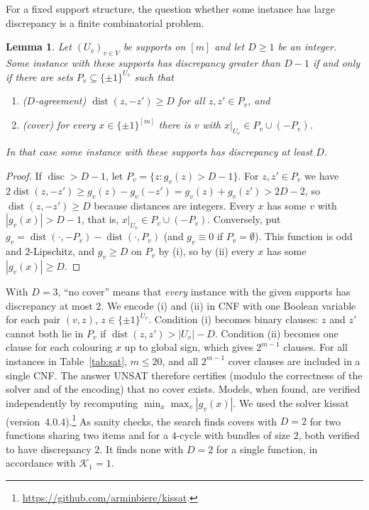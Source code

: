 \documentclass[11pt,letterpaper]{article}
\newtheorem{lemma}[theorem]{Lemma}
\theoremstyle{definition}
\newcommand{\cube}[1]{\{\pm1\}^{#1}}
\DeclareMathOperator{\disc}{disc}
\DeclareMathOperator{\dist}{dist}
\begin{document}
For a fixed support structure, the question whether some instance has large discrepancy is a
finite combinatorial problem.

\begin{lemma}\label{lem:cover}
Let $(U_v)_{v\in V}$ be supports on $[m]$ and let $D\ge1$ be an integer. Some instance with these
supports has discrepancy greater than $D-1$ if and only if there are sets $P_v\subseteq\cube{U_v}$
such that
\begin{enumerate}[label=(\roman*),itemsep=0pt]
\item ($D$-agreement) $\dist(z,-z')\ge D$ for all $z,z'\in P_v$, and
\item (cover) for every $x\in\cube{[m]}$ there is $v$ with $x|_{U_v}\in P_v\cup(-P_v)$.
\end{enumerate}
In that case some instance with these supports has discrepancy at least $D$.
\end{lemma}

\begin{proof}
If $\disc>D-1$, let $P_v=\{z:g_v(z)>D-1\}$. For $z,z'\in P_v$ we have $2\dist(z,-z')\ge
g_v(z)-g_v(-z')=g_v(z)+g_v(z')>2D-2$, so $\dist(z,-z')\ge D$ because distances are integers. Every
$x$ has some $v$ with $|g_v(x)|>D-1$, that is, $x|_{U_v}\in P_v\cup(-P_v)$. Conversely, put
$g_v=\dist(\cdot,-P_v)-\dist(\cdot,P_v)$ (and $g_v\equiv0$ if $P_v=\emptyset$). This function is
odd and $2$-Lipschitz, and $g_v\ge D$ on $P_v$ by (i), so by (ii) every $x$ has some $|g_v(x)|\ge D$.
\end{proof}

With $D=3$, ``no cover'' means that \emph{every} instance with the given supports has discrepancy
at most $2$. We encode (i) and (ii) in CNF with one Boolean variable for each pair $(v,z)$,
$z\in\cube{U_v}$. Condition (i) becomes binary clauses: $z$ and $z'$ cannot both lie in $P_v$ if
$\dist(z,z')>|U_v|-D$. Condition (ii) becomes one clause for each colouring $x$ up to global sign,
which gives $2^{m-1}$ clauses. For all instances in Table~\ref{tab:sat}, $m\le20$, and all $2^{m-1}$ cover clauses
are included in a single CNF. The answer UNSAT therefore certifies (modulo the correctness of the
solver and of the encoding) that no cover exists. Models, when found, are verified independently by
recomputing $\min_x\max_v|g_v(x)|$. We used the solver kissat (version~4.0.4).\footnote{\url{https://github.com/arminbiere/kissat}.}
As sanity checks, the search finds covers with $D=2$ for two functions sharing two items and for a
$4$-cycle with bundles of size $2$, both verified to have discrepancy $2$. It finds none with
$D=2$ for a single function, in accordance with $\mathcal{K}_1=1$.
\end{document}
